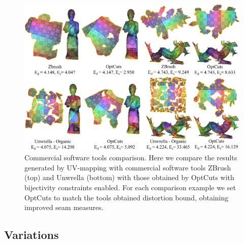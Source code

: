 \begin{figure}[t]
\centering
\includegraphics[width=\linewidth]{fig/comp_commercial.png}
\caption{Commercial software tools comparison. Here we compare the results generated by UV-mapping with commercial software tools ZBrush (top) and Unwrella (bottom) with those obtained by OptCuts with bijectivity constraints enabled. For each comparison example we set OptCuts to match the tools obtained distortion bound, obtaining improved seam measures.
}
\label{fig:comp_commercial}
\end{figure}


\subsection{Variations}
\label{sec:var}
